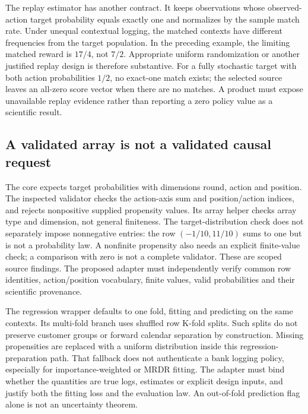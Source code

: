 The replay estimator has another contract. It keeps observations whose
observed-action target probability equals exactly one and normalizes by the
sample match rate. Under unequal contextual logging, the matched contexts have
different frequencies from the target population. In the preceding example,
the limiting matched reward is $17/4$, not $7/2$. Appropriate uniform
randomization or another justified replay design is therefore substantive.
For a fully stochastic target with both action probabilities $1/2$, no exact-one
match exists; the selected source leaves an all-zero score vector when there
are no matches. A product must expose unavailable replay evidence rather than
reporting a zero policy value as a scientific result.
\citep{exec23_obp_sources,exec23_obp_reference}

\subsection{A validated array is not a validated causal request}
\label{exec23:obp-uncertainty}
The core expects target probabilities with dimensions round, action and
position. The inspected validator checks the action-axis sum and position/action
indices, and rejects nonpositive supplied propensity values. Its array helper
checks array type and dimension, not general finiteness. The target-distribution
check does not separately impose nonnegative entries: the row
$(-1/10,11/10)$ sums to one but is not a probability law. A nonfinite propensity
also needs an explicit finite-value check; a comparison with zero is not a
complete validator. These are scoped source findings. The proposed adapter
must independently verify common row identities, action/position vocabulary,
finite values, valid probabilities and their scientific provenance.
\citep{exec23_obp_sources,exec23_obp_reference}

The regression wrapper defaults to one fold, fitting and predicting on the
same contexts. Its multi-fold branch uses shuffled row K-fold splits. Such
splits do not preserve customer groups or forward calendar separation by
construction. Missing propensities are replaced with a uniform distribution
inside this regression-preparation path. That fallback does not authenticate a
bank logging policy, especially for importance-weighted or MRDR fitting. The
adapter must bind whether the quantities are true logs, estimates or explicit
design inputs, and justify both the fitting loss and the evaluation law. An
out-of-fold prediction flag alone is not an uncertainty theorem.
\citep{exec23_obp_sources}

